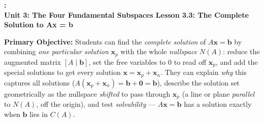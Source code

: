 \documentclass[10pt]{article}
\newcommand{\xx}{\mathbf{x}}
\newcommand{\bb}{\mathbf{b}}
\newcommand{\zero}{\mathbf{0}}
\newcommand{\UnitNumberName}{Unit 3: The Four Fundamental Subspaces \quad}
\newcommand{\LessonNumberName}{Lesson 3.3: The Complete Solution to Ax = b}
\begin{document}
\begin{center}
    {\Large\bfseries \CourseName: \SchoolYear \\
    {\small\bfseries \UnitNumberName \LessonNumberName}}
\end{center}

\begin{tcolorbox}[colback=blush, colframe=burgundy, boxrule=0.9pt, arc=2mm,
    left=2mm, right=2mm, top=1.5mm, bottom=1.5mm]
    \textbf{Primary Objective:} Students can find the \emph{complete solution} of $A\xx=\bb$ by
    combining \emph{one particular solution} $\xx_p$ with the whole \emph{nullspace} $N(A)$: reduce the
    augmented matrix $[A\mid\bb]$, set the free variables to $0$ to read off $\xx_p$, and add the
    special solutions to get every solution $\xx=\xx_p+\xx_n$. They can explain \emph{why} this captures
    all solutions ($A(\xx_p+\xx_n)=\bb+\zero=\bb$), describe the solution set geometrically as the
    nullspace \emph{shifted} to pass through $\xx_p$ (a line or plane \emph{parallel} to $N(A)$, off the
    origin), and test \emph{solvability} --- $A\xx=\bb$ has a solution exactly when $\bb$ lies in $C(A)$.
\end{tcolorbox}
\end{document}
